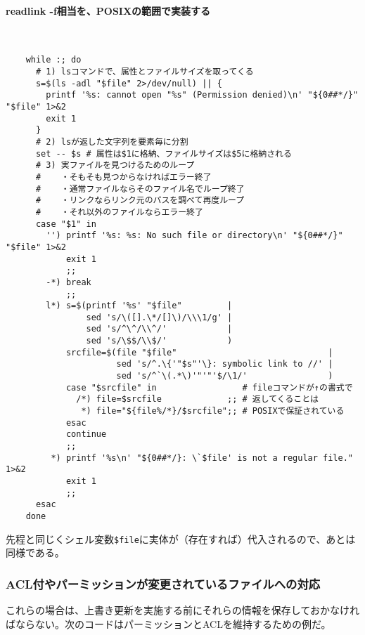 \paragraph{readlink -f相当を、POSIXの範囲で実装する} 　\\
\begin{frameboxit}{160.0mm}
\begin{verbatim}
	while :; do
	  # 1) lsコマンドで、属性とファイルサイズを取ってくる
	  s=$(ls -adl "$file" 2>/dev/null) || {
	    printf '%s: cannot open "%s" (Permission denied)\n' "${0##*/}" "$file" 1>&2
	    exit 1
	  }
	  # 2) lsが返した文字列を要素毎に分割
	  set -- $s # 属性は$1に格納、ファイルサイズは$5に格納される
	  # 3) 実ファイルを見つけるためのループ
	  #    ・そもそも見つからなければエラー終了
	  #    ・通常ファイルならそのファイル名でループ終了
	  #    ・リンクならリンク元のパスを調べて再度ループ
	  #    ・それ以外のファイルならエラー終了
	  case "$1" in
	    '') printf '%s: %s: No such file or directory\n' "${0##*/}" "$file" 1>&2
	        exit 1
	        ;;
	    -*) break
	        ;;
	    l*) s=$(printf '%s' "$file"         |
	            sed 's/\([].\*/[]\)/\\\1/g' |
	            sed 's/^\^/\\^/'            |
	            sed 's/\$$/\\$/'            )
	        srcfile=$(file "$file"                              |
	                  sed 's/^.\{'"$s"'\}: symbolic link to //' |
	                  sed 's/^`\(.*\)'"'"'$/\1/'                )
	        case "$srcfile" in                 # fileコマンドが↑の書式で
	          /*) file=$srcfile             ;; # 返してくることは
	           *) file="${file%/*}/$srcfile";; # POSIXで保証されている
	        esac
	        continue
	        ;;
	     *) printf '%s\n' "${0##*/}: \`$file' is not a regular file." 1>&2
	        exit 1
	        ;;
	  esac
	done
\end{verbatim}
\end{frameboxit}
先程と同じくシェル変数\verb!$file!に実体が（存在すれば）代入されるので、あとは同様である。

\subsubsection*{ACL付やパーミッションが変更されているファイルへの対応}

これらの場合は、上書き更新を実施する前にそれらの情報を保存しておかなければならない。次のコードはパーミッションとACLを維持するための例だ。

